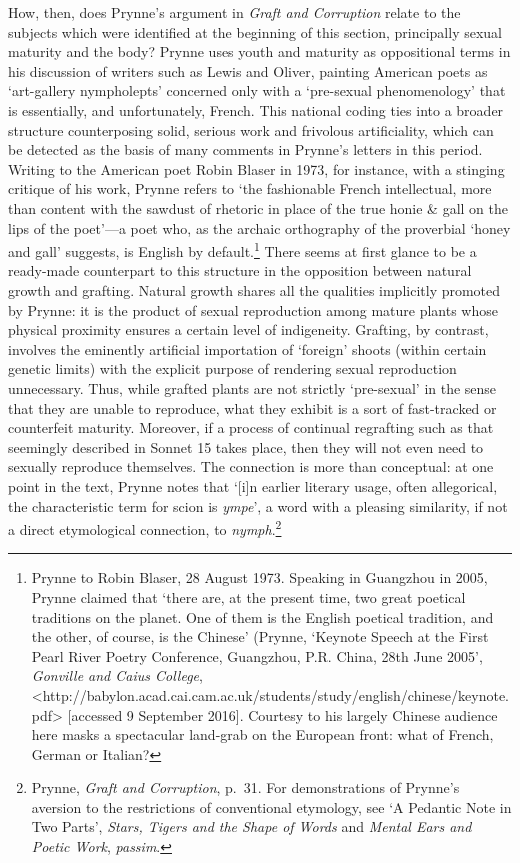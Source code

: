 \documentclass[]{article}
\begin{document}
How, then, does Prynne’s argument in \emph{Graft and Corruption} relate
to the subjects which were identified at the beginning of this section,
principally sexual maturity and the body? Prynne uses youth and maturity
as oppositional terms in his discussion of writers such as Lewis and
Oliver, painting American poets as ‘art-gallery nympholepts’ concerned
only with a ‘pre-sexual phenomenology’ that is essentially, and
unfortunately, French. This national coding ties into a broader
structure counterposing solid, serious work and frivolous artificiality,
which can be detected as the basis of many comments in Prynne’s letters
in this period. Writing to the American poet Robin Blaser in 1973, for
instance, with a stinging critique of his work, Prynne refers to ‘the
fashionable French intellectual, more than content with the sawdust of
rhetoric in place of the true honie \& gall on the lips of the poet’—a
poet who, as the archaic orthography of the proverbial ‘honey and gall’
suggests, is English by default.\footnote{Prynne to Robin Blaser, 28
  August 1973. Speaking in Guangzhou in 2005, Prynne claimed that ‘there
  are, at the present time, two great poetical traditions on the planet.
  One of them is the English poetical tradition, and the other, of
  course, is the Chinese’ (Prynne, ‘Keynote Speech at the First Pearl
  River Poetry Conference, Guangzhou, P.R. China, 28th June 2005’,
  \emph{Gonville and Caius College},
  \textless{}http://babylon.acad.cai.cam.ac.uk/students/study/english/chinese/keynote.pdf\textgreater{}
  {[}accessed 9 September 2016{]}. Courtesy to his largely Chinese
  audience here masks a spectacular land-grab on the European front:
  what of French, German or Italian?} There seems at first glance to be
a ready-made counterpart to this structure in the opposition between
natural growth and grafting. Natural growth shares all the qualities
implicitly promoted by Prynne: it is the product of sexual reproduction
among mature plants whose physical proximity ensures a certain level of
indigeneity. Grafting, by contrast, involves the eminently artificial
importation of ‘foreign’ shoots (within certain genetic limits) with the
explicit purpose of rendering sexual reproduction unnecessary. Thus,
while grafted plants are not strictly ‘pre-sexual’ in the sense that
they are unable to reproduce, what they exhibit is a sort of
fast-tracked or counterfeit maturity. Moreover, if a process of
continual regrafting such as that seemingly described in Sonnet 15 takes
place, then they will not even need to sexually reproduce themselves.
The connection is more than conceptual: at one point in the text, Prynne
notes that ‘{[}i{]}n earlier literary usage, often allegorical, the
characteristic term for scion is \emph{ympe}’, a word with a pleasing
similarity, if not a direct etymological connection, to
\emph{nymph}.\footnote{Prynne, \emph{Graft and Corruption}, p.~31. For
  demonstrations of Prynne’s aversion to the restrictions of
  conventional etymology, see ‘A Pedantic Note in Two Parts’,
  \emph{Stars, Tigers and the Shape of Words} and \emph{Mental Ears and
  Poetic Work}, \emph{passim}.}
\end{document}
